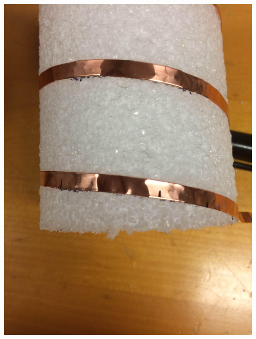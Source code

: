 \documentclass[11pt]{article} %
\begin{document}
\begin{center}
\includegraphics[scale=0.14]{feed/12.jpeg}
\end{center}
\end{document}
